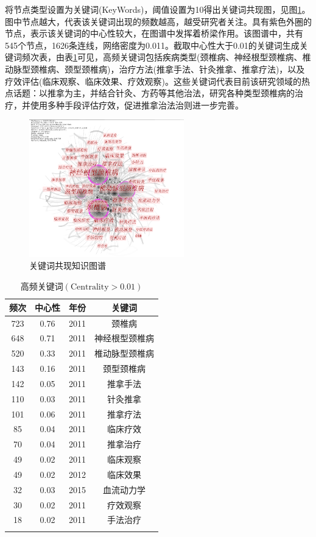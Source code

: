 \documentclass[lang=cn,11pt,a4paper,cite=super,AutoFakeBold,chinesefont=founder]{elegantpaper}
\begin{document}
将节点类型设置为关键词(KeyWords)，阈值设置为10得出关键词共现图，见图\ref{figure:3}。图中节点越大，代表该关键词出现的频数越高，越受研究者关注。具有紫色外圈的节点，表示该关键词的中心性较大，在图谱中发挥着桥梁作用。该图谱中，共有545个节点，1626条连线，网络密度为0.011。截取中心性大于0.01的关键词生成关键词频次表，由表\ref{tabular:1}可见，高频关键词包括疾病类型(颈椎病、神经根型颈椎病、椎动脉型颈椎病、颈型颈椎病)，治疗方法(推拿手法、针灸推拿、推拿疗法)，以及疗效评估(临床观察、临床效果、疗效观察)。这些关键词代表目前该研究领域的热点话题：以推拿为主，并结合针灸、方药等其他治法，研究各种类型颈椎病的治疗，并使用多种手段评估疗效，促进推拿治法治则进一步完善。

\begin{figure}[!ht]
  \centering
  \includegraphics[width=0.6\textwidth]{figure/关键词共现.png}
  \caption{关键词共现知识图谱}
  \label{figure:3}
\end{figure}

\begin{table}[!ht]
\caption{高频关键词$(\text{Centrality} > 0.01)$}
  \centering
  \begin{tabular}{*4{c}}
  \toprule
  频次  & 中心性  & 年份   & 关键词     \\
  \midrule
  723 & 0.76 & 2011 & 颈椎病     \\
  648 & 0.71 & 2011 & 神经根型颈椎病 \\
  520 & 0.33 & 2011 & 椎动脉型颈椎病 \\
  143 & 0.16 & 2011 & 颈型颈椎病   \\
  142 & 0.05 & 2011 & 推拿手法    \\
  110 & 0.03 & 2011 & 针灸推拿    \\
  101 & 0.06 & 2011 & 推拿疗法    \\
  85  & 0.04 & 2011 & 临床疗效    \\
  70  & 0.04 & 2011 & 推拿治疗    \\
  49  & 0.02 & 2011 & 临床观察    \\
  49  & 0.02 & 2012 & 临床效果    \\
  32  & 0.03 & 2015 & 血流动力学   \\
  30  & 0.02 & 2011 & 疗效观察    \\
  18  & 0.02 & 2011 & 手法治疗    \\
  \bottomrule
  \label{tabular:1}
  \end{tabular}
\end{table}
\end{document}
